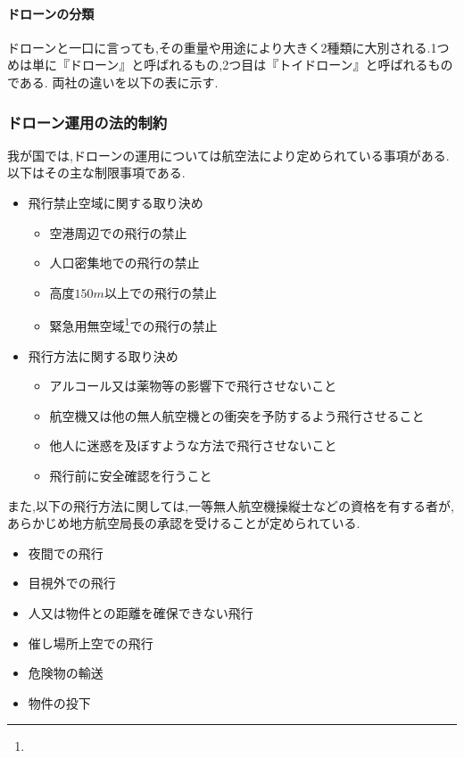 \documentclass{article}[jsarticle]
\begin{document}
\paragraph{ドローンの分類}
ドローンと一口に言っても,その重量や用途により大きく2種類に大別される.1つめは単に『ドローン』と呼ばれるもの,2つ目は『トイドローン』と呼ばれるものである.
両社の違いを以下の表に示す.

\subsubsection{ドローン運用の法的制約}
我が国では,ドローンの運用については航空法により定められている事項がある.以下はその主な制限事項である.
\begin{itemize}
    \item 飛行禁止空域に関する取り決め
    \begin{itemize}
        \item 空港周辺での飛行の禁止
        \item 人口密集地での飛行の禁止
        \item 高度$150m$以上での飛行の禁止
        \item 緊急用無空域\footnote{}での飛行の禁止
    \end{itemize}
    \item 飛行方法に関する取り決め
    \begin{itemize}
        \item アルコール又は薬物等の影響下で飛行させないこと
        \item 航空機又は他の無人航空機との衝突を予防するよう飛行させること
        \item 他人に迷惑を及ぼすような方法で飛行させないこと
        \item 飛行前に安全確認を行うこと 
    \end{itemize}
\end{itemize}
また,以下の飛行方法に関しては,一等無人航空機操縦士などの資格を有する者が,あらかじめ地方航空局長の承認を受けることが定められている.
\begin{itemize}
    \item 夜間での飛行
    \item 目視外での飛行
    \item 人又は物件との距離を確保できない飛行
    \item 催し場所上空での飛行
    \item 危険物の輸送
    \item 物件の投下
\end{itemize}
\end{document}
